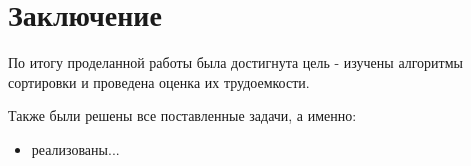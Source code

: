 \chapter*{Заключение}
По итогу проделанной работы была достигнута цель - изучены алгоритмы сортировки и проведена оценка их трудоемкости.

Также были решены все поставленные задачи, а именно:

\begin{itemize}
	\item реализованы...
\end{itemize}